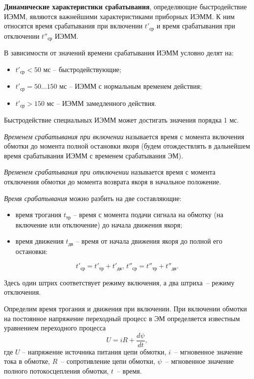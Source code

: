 \textbf{Динамические характеристики срабатывания}, определяющие быстродействие ИЭММ, являются важнейшими характеристиками приборных ИЭММ. К ним относятся время срабатывания при включении $ t'_\text{ср} $ и время срабатывания при отключении $ t''_\text{ср} $ ИЭММ.

В зависимости от значений времени срабатывания ИЭММ условно делят на:
\begin{itemize}
\item $ t'_\text{ср} < 50 $ мс -- быстродействующие;
\item $ t'_\text{ср} = 50\ldots150 $ мс -- ИЭММ с нормальным временем действия;
\item $ t'_\text{ср} > 150 $ мс -- ИЭММ замедленного действия.
\end{itemize}

Быстродействие специальных ИЭММ может достигать значения порядка 1 мс.

\textit{Временем срабатывания при включении} называется время с момента включения обмотки до момента полной остановки якоря (будем отождествлять в дальнейшем время срабатывания ИЭММ с временем срабатывания ЭМ).

\textit{Временем срабатывания при отключении} называется время с момента отключения обмотки до момента возврата якоря в начальное положение.

\textit{Время срабатывания} можно разбить на две составляющие:
\begin{itemize}
\item время трогания $ t_\text{тр} $ -- время с момента подачи сигнала на обмотку (на включение или отключение) до начала движения якоря;
\item время движения $ t_\text{дв} $ -- время от начала движения якоря до полной его остановки:
\end{itemize}
\[ t'_\text{ср} = t'_\text{тр} + t'_\text{дв},\, t''_\text{ср} = t''_\text{тр} + t''_\text{дв}.  \]

Здесь один штрих соответствует режиму включения, а два штриха~-- режиму отключения.

Определим время трогания и движения при включении. При включении обмотки на постоянное напряжение переходный процесс в ЭМ определяется известным уравнением переходного процесса
\[ U = iR + \dfrac{d\psi}{dt}, \]
где $ U $ -- напряжение источника питания цепи обмотки, $ i $~-- мгновенное значение тока в обмотке, $ R $~-- сопротивление цепи обмотки, $ \psi $~-- мгновенное значение полного потокосцепления обмотки, $ t $~-- время.

